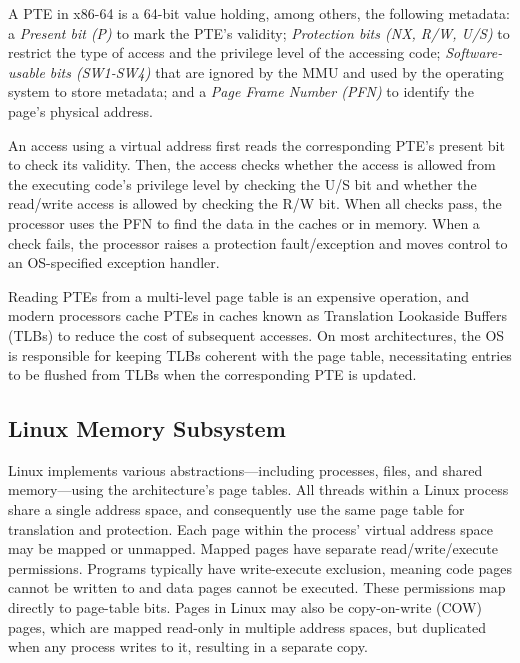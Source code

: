 \documentclass[letterpaper,twocolumn,10pt]{article}
\begin{document}
A PTE in x86-64 is a 64-bit value holding, among others, the following metadata:
a \emph{Present bit (P)} to mark the PTE's validity;
\emph{Protection bits (NX, R/W, U/S)} to restrict the type of
access and the privilege level of the accessing code;
\emph{Software-usable bits (SW1-SW4)} that are ignored by the MMU and used by the
operating system to store metadata; and
a \emph{Page Frame Number (PFN)} to identify the page's physical address.

An access using a virtual address first reads the corresponding PTE's
present bit to check its validity.
Then, the access checks whether the access is allowed from the executing
code's privilege level by checking the U/S bit and whether the
read/write access is allowed by checking the R/W bit.
When all checks pass, the processor uses the PFN to find the data in
the caches or in memory.
When a check fails, the processor raises a protection fault/exception and
moves control to an OS-specified exception handler.

Reading PTEs from a multi-level page table is an expensive operation, and
modern processors cache PTEs in caches known as Translation Lookaside
Buffers (TLBs) to reduce the cost of subsequent accesses.
On most architectures, the OS is responsible for keeping TLBs coherent with
the page table, necessitating entries to be flushed from TLBs when the
corresponding PTE is updated.


\subsection{Linux Memory Subsystem}

Linux implements various abstractions---including processes, files, and shared
memory---using the architecture's page tables.
All threads within a Linux process share a single address space, and
consequently use the same page table for translation and protection.
Each page within the process' virtual address space may be mapped or
unmapped. Mapped pages have separate read/write/execute permissions.
Programs typically have write-execute exclusion, meaning
code pages cannot be written to and data pages cannot be executed.
These permissions map directly to page-table bits.
Pages in Linux may also be copy-on-write (COW) pages, which are mapped read-only
in multiple address spaces, but duplicated when any process writes
to it, resulting in a separate copy.
\end{document}
